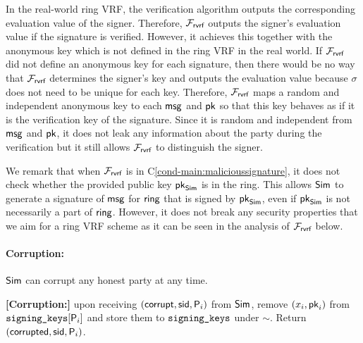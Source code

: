 \begin{tcolorbox}[left=2pt,right=2pt]
	\end{tcolorbox}
	
	In the real-world ring VRF, the verification algorithm outputs the corresponding evaluation value of the signer. Therefore, $ \mathcal{F}_{\textsf{rvrf}} $  outputs the signer's evaluation value if the signature is verified. However, it achieves this together with the anonymous key which is not defined in the ring VRF in the real world.  If $ \mathcal{F}_{\textsf{rvrf}} $ did not define an anonymous key for  each signature, then there would be no way that $ \mathcal{F}_{\textsf{rvrf}} $ determines the signer's key and outputs the evaluation value because $ \sigma $ does not need to be unique for each key. Therefore, $ \mathcal{F}_{\textsf{rvrf}} $ maps a random and independent anonymous key to each $ \mathsf{msg} $ and $ \mathsf{pk} $ so that this key behaves as if it is the verification key of the signature. Since it  is  random and independent from $ \mathsf{msg} $ and $ \mathsf{pk} $, it does not leak any information about the party during the verification but it still allows $ \mathcal{F}_{\textsf{rvrf}} $ to distinguish the signer.
	
	We remark that when $ \mathcal{F}_{\textsf{rvrf}} $ is in C\ref{cond-main:malicioussignature}, it does not check whether the provided public key $ \mathsf{pk}_{\mathsf{Sim}} $ is in the ring. This allows $\mathsf{Sim}$ to generate a signature of $\mathsf{msg}$ for $\mathsf{ring}$ that is signed by $\mathsf{pk}_{\mathsf{Sim}}$, even if $\mathsf{pk}_{\mathsf{Sim}}$ is not necessarily a part of $\mathsf{ring}$. However, it does not break any security properties that we aim for a ring VRF scheme as it can be seen in the analysis of $ \mathcal{F}_{\textsf{rvrf}} $ below.
	
	\paragraph{Corruption:} $ \mathsf{Sim} $ can corrupt any honest party at any time.  
	
	\begin{tcolorbox}[left=2pt,right=2pt]
		\eprint{}{\scriptsize}
		\textbf{[Corruption:] } 
		upon receiving $ (\mathsf{corrupt}, \textsf{sid}, \mathsf{P}_i) $ from $ \mathsf{Sim} $, remove $ (x_i,\mathsf{pk}_i) $ from $ \texttt{signing\_keys}[\mathsf{P}_i] $ and store them to $ \texttt{signing\_keys} $ under $ \sim $. Return $ (\mathsf{corrupted}, \textsf{sid},\mathsf{P}_i) $.
	\end{tcolorbox}
	
